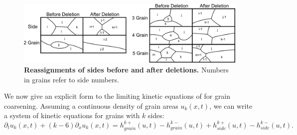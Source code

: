 \begin{figure}
\begin{centering}
\includegraphics{grainpic.png}
\caption{\textbf{Reassignments of sides before and after deletions.  }\label{distrules} Numbers in grains refer to side numbers.}
\end{centering}
\end{figure}
We now give an explicit form to the limiting kinetic equations of \cite{klob2013pdmp1} for grain coarsening. Assuming a continuous density of grain areas $u_k(x,t)$, we  can write a system of kinetic equations  for grains with $k$ sides:\begin{equation}\label{grainpde}
\partial_tu_{k}(x,t)+(k-6)\partial_xu_{k}(x,t) = h^{k+}_{grain}(u,t)-h_{grain}^{k-}(u,t)+h^{k+}_{side}(u,t)-h_{side}^{k-}(u,t).
\end{equation}

